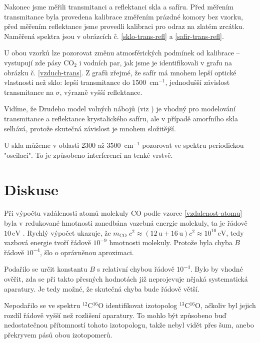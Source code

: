 \documentclass[10pt,a4paper]{article}
\renewcommand{\U}[1]{\ensuremath{\,\mathrm{#1}}}
\newcommand{\°}{\degree}
\begin{document}
Nakonec jsme měřili transmitanci a reflektanci skla a safíru. Před měřením transmitance byla provedena kalibrace změřením prázdné komory bez vzorku, před měřením reflektance jsme provedli kalibraci pro odraz na zlatém zrcátku. Naměřená spektra jsou v obrázcích č. \ref{sklo-trans-refl} a \ref{safir-trans-refl}.

U obou vzorků lze pozorovat změnu atmosférických podmínek od kalibrace – vystupují zde pásy CO$_2$ i vodních par, jak jsme je identifikovali v grafu na obrázku č. \ref{vzduch-trans}. Z grafů zřejmé, že safír má mnohem lepší optické vlastnosti než sklo: lepší transmitance do 1500 \U{cm^{-1}}, jednodušší závislost transmitance na $\sigma$, výrazně vyšší reflektance.

Vidíme, že Drudeho model volných nábojů (viz \cite{studijni-text}) je vhodný pro modelování transmitance a reflektance krystalického safíru, ale v případě amorfního skla selhává, protože skutečná závislost je mnohem složitější.

U skla můžeme v oblasti 2300 až 3500 \U{cm^{-1}} pozorovat ve spektru periodickou "oscilaci". To je způsobeno interferencí na tenké vrstvě.


\section{Diskuse}
Při výpočtu vzdálenosti atomů molekuly CO podle vzorce \eqref{vzdalenost-atomu} byla v redukované hmotnosti zanedbána vazebná energie molekuly, ta je řádově $10 \U{eV}$ \cite{wiki:carbon-monoxide}. Rychlý výpočet ukazuje, že $m_\mathrm{CO} \; c^2 \approx (12\U{u} + 16\U{u})c^2 \approx 10^{10} \U{eV}$, tedy vazbová energie tvoří řádově $10^{-9}$ hmotnosti molekuly. Protože byla chyba $B$ řádově $10^{-4}$, šlo o oprávněnou aproximaci.

Podařilo se určit konstantu $B$ s relativní chybou řádově $10^{-4}$. Bylo by vhodné ověřit, zda se při takto přesných hodnotách již neprojevuje nějaká systematická aparatury. Je tedy možné, že skutečná chyba bude řádově větší.

Nepodařilo se ve spektru $^{12}$C$^{16}$O identifikovat izotopolog $^{13}$C$^{16}$O, ačkoliv byl jejich rozdíl řádově vyšší než rozlišení aparatury. To mohlo být způsobeno buď nedostatečnou přítomností tohoto izotopologu, takže nebyl vidět přes šum, anebo překryvem pásů obou izotopomerů.
\end{document}
